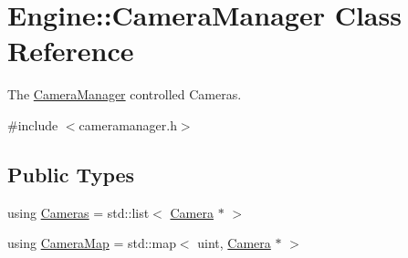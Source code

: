 \hypertarget{classEngine_1_1CameraManager}{}\section{Engine\+:\+:Camera\+Manager Class Reference}
\label{classEngine_1_1CameraManager}


The \hyperlink{classEngine_1_1CameraManager}{Camera\+Manager} controlled Cameras.  




{\ttfamily \#include $<$cameramanager.\+h$>$}

\subsection*{Public Types}
\begin{DoxyCompactItemize}
\item 
using \hyperlink{classEngine_1_1CameraManager_aadc529c6b245d7b6f57774bba20f1c21}{Cameras} = std\+::list$<$ \hyperlink{classEngine_1_1Camera}{Camera} $\ast$ $>$
\item 
using \hyperlink{classEngine_1_1CameraManager_a9ec0ae8ac0232b41f018af98f57c1f6b}{Camera\+Map} = std\+::map$<$ uint, \hyperlink{classEngine_1_1Camera}{Camera} $\ast$ $>$
\end{DoxyCompactItemize}
